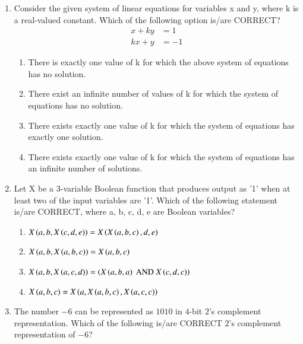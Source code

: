 \documentclass[a4paper, 11pt]{article}
\begin{document}
\begin{enumerate}
    \item Consider the given system of linear equations for variables x and y, where k is a real-valued constant. Which of the following option is/are CORRECT?
    \begin{align*}
        x + ky &= 1 \\
        kx + y &= -1
    \end{align*}
    \begin{enumerate}
        \item There is exactly one value of k for which the above system of equations has no solution.
        \item There exist an infinite number of values of k for which the system of equations has no solution.
        \item There exists exactly one value of k for which the system of equations has exactly one solution.
        \item There exists exactly one value of k for which the system of equations has an infinite number of solutions.
    \end{enumerate}

    \hfill{}

    \item Let X be a $3$-variable Boolean function that produces output as '1' when at least two of the input variables are '1'. Which of the following statement is/are CORRECT, where a, b, c, d, e are Boolean variables?
    \begin{enumerate}
        \item $X\left(a,b,X\left(c,d,e\right)\right) = X\left(X\left(a,b,c\right),d,e\right)$
        \item $X\left(a,b,X\left(a,b,c\right)\right) = X\left(a,b,c\right)$
        \item $X\left(a,b,X\left(a,c,d\right)\right) = \left(X\left(a,b,a\right) \text{ AND } X\left(c,d,c\right)\right)$
        \item $X\left(a,b,c\right) = X\left(a,X\left(a,b,c\right),X\left(a,c,c\right)\right)$
    \end{enumerate}

    \hfill{}

    \item The number $-6$ can be represented as $1010$ in $4$-bit $2$'s complement representation. Which of the following is/are CORRECT $2$'s complement representation of $-6$?
    \begin{enumerate}
    \end{enumerate}


\end{enumerate}
\end{document}
